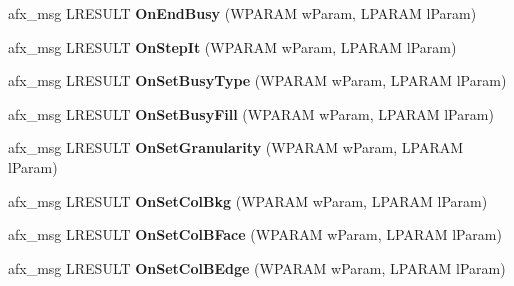 \begin{DoxyCompactItemize}
\item 
\hypertarget{class_cx_prog_ctrl_ace0f158c8af670efca951c8c5793f245}{afx\-\_\-msg L\-R\-E\-S\-U\-L\-T {\bfseries On\-End\-Busy} (W\-P\-A\-R\-A\-M w\-Param, L\-P\-A\-R\-A\-M l\-Param)}\label{class_cx_prog_ctrl_ace0f158c8af670efca951c8c5793f245}

\item 
\hypertarget{class_cx_prog_ctrl_ae5e46862a8ca46108a00902f77d0a71e}{afx\-\_\-msg L\-R\-E\-S\-U\-L\-T {\bfseries On\-Step\-It} (W\-P\-A\-R\-A\-M w\-Param, L\-P\-A\-R\-A\-M l\-Param)}\label{class_cx_prog_ctrl_ae5e46862a8ca46108a00902f77d0a71e}

\item 
\hypertarget{class_cx_prog_ctrl_a50c2fde3fab82130861acdfc5fd4fca2}{afx\-\_\-msg L\-R\-E\-S\-U\-L\-T {\bfseries On\-Set\-Busy\-Type} (W\-P\-A\-R\-A\-M w\-Param, L\-P\-A\-R\-A\-M l\-Param)}\label{class_cx_prog_ctrl_a50c2fde3fab82130861acdfc5fd4fca2}

\item 
\hypertarget{class_cx_prog_ctrl_abec07d69a39b6424a7287c4fbe67ecfe}{afx\-\_\-msg L\-R\-E\-S\-U\-L\-T {\bfseries On\-Set\-Busy\-Fill} (W\-P\-A\-R\-A\-M w\-Param, L\-P\-A\-R\-A\-M l\-Param)}\label{class_cx_prog_ctrl_abec07d69a39b6424a7287c4fbe67ecfe}

\item 
\hypertarget{class_cx_prog_ctrl_a56c78d60610e5218fdcb8beab7498bb6}{afx\-\_\-msg L\-R\-E\-S\-U\-L\-T {\bfseries On\-Set\-Granularity} (W\-P\-A\-R\-A\-M w\-Param, L\-P\-A\-R\-A\-M l\-Param)}\label{class_cx_prog_ctrl_a56c78d60610e5218fdcb8beab7498bb6}

\item 
\hypertarget{class_cx_prog_ctrl_a1866a7b39448c0265a84c493e627b55f}{afx\-\_\-msg L\-R\-E\-S\-U\-L\-T {\bfseries On\-Set\-Col\-Bkg} (W\-P\-A\-R\-A\-M w\-Param, L\-P\-A\-R\-A\-M l\-Param)}\label{class_cx_prog_ctrl_a1866a7b39448c0265a84c493e627b55f}

\item 
\hypertarget{class_cx_prog_ctrl_a44d3359145d79ac9273e836a62045d7a}{afx\-\_\-msg L\-R\-E\-S\-U\-L\-T {\bfseries On\-Set\-Col\-B\-Face} (W\-P\-A\-R\-A\-M w\-Param, L\-P\-A\-R\-A\-M l\-Param)}\label{class_cx_prog_ctrl_a44d3359145d79ac9273e836a62045d7a}

\item 
\hypertarget{class_cx_prog_ctrl_a5685f385a3a219d73ffa5c2da22f170d}{afx\-\_\-msg L\-R\-E\-S\-U\-L\-T {\bfseries On\-Set\-Col\-B\-Edge} (W\-P\-A\-R\-A\-M w\-Param, L\-P\-A\-R\-A\-M l\-Param)}\label{class_cx_prog_ctrl_a5685f385a3a219d73ffa5c2da22f170d}


\end{DoxyCompactItemize}
